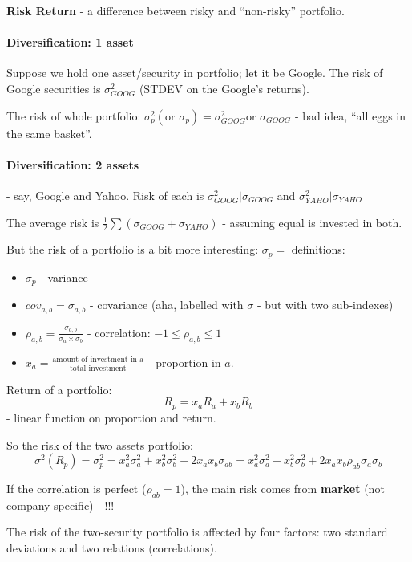 \documentclass{scrartcl}
\begin{document}
{\bf Risk Return} - a difference between risky and ``non-risky'' portfolio. 

\paragraph{Diversification: 1 asset}
Suppose we hold one asset/security in portfolio; let it be Google. The risk of
Google securities is $\sigma_{GOOG}^2$ (STDEV on the Google's returns).

The risk of whole portfolio: $\sigma^2_p (\text{or }\sigma_p) =
\sigma^2_{GOOG}\text{or }\sigma_{GOOG}$
- bad idea, ``all eggs in the same basket''.

\paragraph{Diversification: 2  assets}

- say, Google and Yahoo. Risk of each is $\sigma^2_{GOOG}|\sigma_{GOOG}$ and $\sigma^2_{YAHO}|\sigma_{YAHO}$

The average risk is $\frac12 \sum (\sigma_{GOOG} + \sigma_{YAHO})$ 
- assuming equal is invested in both. 

But the risk of a portfolio is a bit more interesting: $\sigma_p = $
definitions:
\begin{itemize}
\item $\sigma_p$ - variance
\item $cov_{a, b} = \sigma_{a, b}$ - covariance (aha, labelled with $\sigma$ -
  but with two sub-indexes)
\item $\rho_{a, b} = \frac{ \sigma_{a, b}}{\sigma_a \times \sigma_b}$ -
  correlation: $-1 \leq \rho_{a,b} \leq 1$
\item $x_a = \frac{\text{amount of investment in a}}{\text{total investment}}$ -
  proportion in $a$.
\end{itemize}
Return of a portfolio:
 $$R_p = x_a R_a + x_b R_b$$ -  linear function on proportion and return.

So the risk of the two assets portfolio:
$$\sigma^2(R_p) = \sigma^2_p = x_a^2\sigma_a^2 + x_b^2\sigma_b^2 + 2 x_a x_b
\sigma_{ab} =  x_a^2\sigma_a^2 + x_b^2\sigma_b^2 + 2 x_a x_b
\rho_{ab}\sigma_a \sigma_b$$

If the correlation is perfect ($\rho_{ab} = 1$), the main risk comes from {\bf
  market} (not company-specific) - !!!

The risk of the two-security portfolio is affected by four factors: two standard
deviations and two relations (correlations).  
\end{document}

